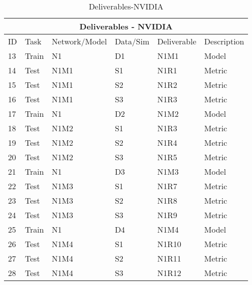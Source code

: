 \documentclass{article}
\begin{document}



\begin{table}[]
\begin{center}
\begin{tabular}{|l|l|l|l|l|l|}
\hline
\multicolumn{6}{|c|}{Deliverables - NVIDIA} \\ \hline

ID & Task &  Network/Model & Data/Sim & Deliverable & Description \\ \hline\hline
13 & Train & N1 & D1 & N1M1 & Model \\ \hline
14 & Test & N1M1 & S1 & N1R1 & Metric \\ \hline
15 & Test & N1M1 & S2 & N1R2 & Metric \\ \hline
16 & Test & N1M1 & S3 & N1R3 & Metric \\ \hline\hline

17 & Train & N1 & D2 & N1M2 & Model \\ \hline
18 & Test & N1M2 & S1 & N1R3 & Metric \\ \hline
19 & Test & N1M2 & S2 & N1R4 & Metric \\ \hline
20 & Test & N1M2 & S3 & N1R5 & Metric \\ \hline\hline

21 & Train & N1 & D3 & N1M3 & Model \\ \hline
22 & Test & N1M3 & S1 & N1R7 & Metric \\ \hline
23 & Test & N1M3 & S2 & N1R8 & Metric \\ \hline
24 & Test & N1M3 & S3 & N1R9 & Metric \\ \hline\hline

25 & Train & N1 & D4 & N1M4 & Model \\ \hline
26 & Test & N1M4 & S1 & N1R10 & Metric \\ \hline
27 & Test & N1M4 & S2 & N1R11 & Metric \\ \hline
28 & Test & N1M4 & S3 & N1R12 & Metric \\ \hline 

\end{tabular}
\end{center}
\caption{Deliverables-NVIDIA}
\label{Deliverables-NVIDIA}
\end{table}


\end{document}
